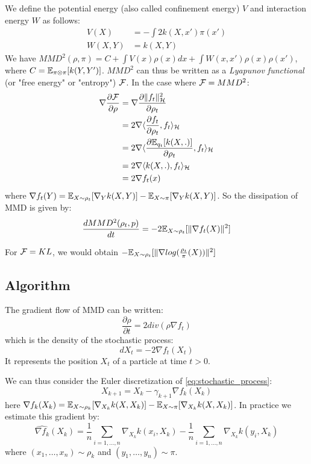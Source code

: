 We define the potential energy (also called confinement energy) $V$ and interaction energy $W$ as follows:
\begin{align}
V(X)&=-\int 2 k(X,x')\pi(x')\\
W(X,Y)&=k(X,Y)
\end{align}
We have $MMD^2(\rho,\pi)=C+ \int V(x) \rho(x)dx + \int W(x,x')\rho(x)\rho(x')$, where $C={{\mathbb E}}_{\pi\otimes \pi}[k(Y,Y')]$. $MMD^2$ can thus be written as a \textit{Lyapunov functional} (or "free energy" or "entropy") ${{\mathcal F}}$.
In the case where ${{\mathcal F}}=MMD^2$:
\begin{align}
\nabla \frac{\partial {{\mathcal F}}}{\partial \rho}&= \nabla \frac{\partial \|f_t\|^2_{{{\mathcal H}}}}{\partial \rho_t}\\
&=2 \nabla \langle \frac{\partial f_t}{\partial \rho_t}, f_t \rangle_{{{\mathcal H}}}\\
&=2 \nabla \langle \frac{\partial {{\mathbb E}}_{q_t}[k(X,.)]}{\partial \rho_t}, f_t \rangle_{{{\mathcal H}}}\\
&=2 \nabla \langle k(X,.), f_t \rangle_{{{\mathcal H}}}\\
&= 2 \nabla f_t(x)
\end{align}
where $\nabla f_t(Y)= {{\mathbb E}}_{X \sim \rho_t}[\nabla_{Y}k(X,Y)] -  {{\mathbb E}}_{X \sim \pi}[\nabla_{Y}k(X,Y)]$. So the dissipation of MMD is given by:  
\begin{equation}
\frac{d MMD^2(\rho_t, p)}{dt}=-2 {{\mathbb E}}_{X \sim \rho_t}[\|\nabla f_t(X)\|^2]
\end{equation}

\begin{remark}
	For ${{\mathcal F}}=KL$, we would obtain $-{{\mathbb E}}_{X \sim \rho_t}[\|\nabla log(\frac{\rho_t}{\pi}(X))\|^2]$
\end{remark}




\subsection{Algorithm}

The gradient flow of MMD can be written:
\begin{equation*}
\frac{\partial \rho}{\partial t}= 2 div(\rho  \nabla f_t)
\end{equation*}
which is the density of the stochastic process:
\begin{equation}\label{eq:stochastic_process}
dX_t=-2\nabla f_t(X_t) 
\end{equation}
It represents the position $X_t$ of a particle at time $t > 0$.


We can thus consider the Euler discretization of \eqref{eq:stochastic_process}:
\begin{equation}\label{eq:discretization}
X_{k+1}=X_k - \gamma_{k+1} \nabla f_k(X_k)
\end{equation}
here $\nabla f_k(X_k)= {{\mathbb E}}_{X \sim \rho_k}[\nabla_{X_k}k(X,X_k)] -  {{\mathbb E}}_{X \sim \pi}[\nabla_{X_k}k(X,X_k)]$.
In practice we estimate this gradient by:
\begin{equation*}
\widehat{\nabla f_k}(X_k)=\frac{1}{n}\sum_{i=1,\dots,n}\nabla_{X_k}k(x_i,X_k) - \frac{1}{n}\sum_{i=1,\dots,n}\nabla_{X_k}k(y_i,X_k)
\end{equation*}
where $(x_1, \dots, x_n)\sim \rho_k$ and $(y_1, \dots, y_n)\sim \pi$.